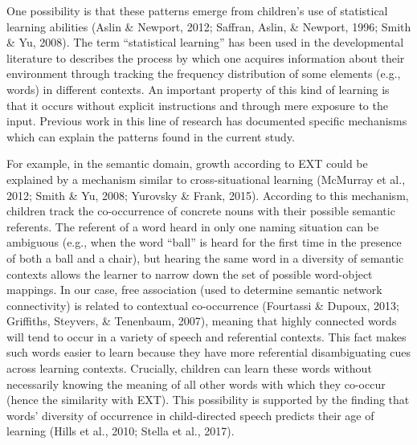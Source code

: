 \documentclass[english,,man,floatsintext]{apa6}
\begin{document}
One possibility is that these patterns emerge from children's use of statistical learning abilities (Aslin \& Newport, 2012; Saffran, Aslin, \& Newport, 1996; Smith \& Yu, 2008). The term \enquote{statistical learning} has been used in the developmental literature to describes the process by which one acquires information about their environment through tracking the frequency distribution of some elements (e.g., words) in different contexts. An important property of this kind of learning is that it occurs without explicit instructions and through mere exposure to the input. Previous work in this line of research has documented specific mechanisms which can explain the patterns found in the current study.

For example, in the semantic domain, growth according to EXT could be explained by a mechanism similar to cross-situational learning (McMurray et al., 2012; Smith \& Yu, 2008; Yurovsky \& Frank, 2015). According to this mechanism, children track the co-occurrence of concrete nouns with their possible semantic referents. The referent of a word heard in only one naming situation can be ambiguous (e.g., when the word \enquote{ball} is heard for the first time in the presence of both a ball and a chair), but hearing the same word in a diversity of semantic contexts allows the learner to narrow down the set of possible word-object mappings. In our case, free association (used to determine semantic network connectivity) is related to contextual co-occurrence (Fourtassi \& Dupoux, 2013; Griffiths, Steyvers, \& Tenenbaum, 2007), meaning that highly connected words will tend to occur in a variety of speech and referential contexts. This fact makes such words easier to learn because they have more referential disambiguating cues across learning contexts. Crucially, children can learn these words without necessarily knowing the meaning of all other words with which they co-occur (hence the similarity with EXT). This possibility is supported by the finding that words' diversity of occurrence in child-directed speech predicts their age of learning (Hills et al., 2010; Stella et al., 2017).
\end{document}

